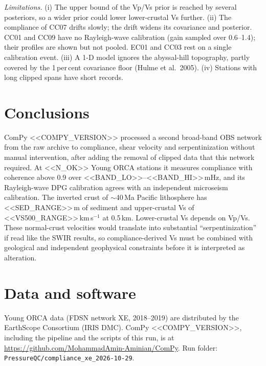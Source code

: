 \documentclass[10pt,a4paper,twocolumn]{article}
\begin{document}
\textit{Limitations.} (i) The upper bound of the Vp/Vs prior is reached by several posteriors, so a wider prior could lower
lower-crustal Vs further. (ii) The compliance of CC07 drifts slowly; the drift widens its covariance and posterior. CC01 and CC09 have no
Rayleigh-wave calibration (gain sampled over 0.6--1.4); their profiles are shown but not pooled. EC01 and CC03 rest on a single
calibration event. (iii) A 1-D model ignores the abyssal-hill topography, partly covered by the
1\,per\,cent covariance floor (Hulme et al.\ 2005). (iv) Stations with long clipped spans have short records.

\section{Conclusions}
ComPy <<COMPY_VERSION>> processed a second broad-band OBS network from the raw archive to compliance, shear velocity and
serpentinization without manual intervention, after adding the removal of clipped data that this network required. At
<<N_OK>> Young ORCA stations it measures compliance with coherence above 0.9 over <<BAND_LO>>--<<BAND_HI>>\,mHz, and its
Rayleigh-wave DPG calibration agrees with an independent microseism calibration. The inverted crust of $\sim$40\,Ma Pacific
lithosphere has <<SED_RANGE>>\,m of sediment and upper-crustal Vs of <<VS500_RANGE>>\,km\,s$^{-1}$ at 0.5\,km. Lower-crustal Vs depends
on Vp/Vs. These normal-crust velocities would translate into substantial ``serpentinization'' if read like the SWIR results, so
compliance-derived Vs must be combined with geological and independent geophysical constraints before it is interpreted as alteration.

\section*{Data and software}
Young ORCA data (FDSN network XE, 2018--2019) are distributed by the EarthScope Consortium (IRIS DMC). ComPy
<<COMPY_VERSION>>, including the pipeline and the scripts of this run, is at \url{https://github.com/MohammadAmin-Aminian/ComPy}.
Run folder: \texttt{PressureQC/compliance\_xe\_2026-10-29}.

\footnotesize
\end{document}
